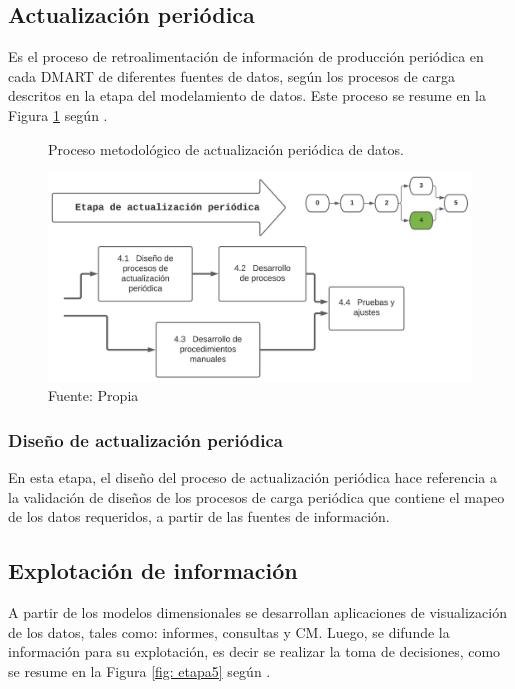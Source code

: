 \documentclass[12pt,jou]{apa7}
\begin{document}
\subsection{Actualización periódica}
Es el proceso de retroalimentación de información de producción periódica en cada DMART de diferentes fuentes de datos, según los procesos de carga descritos en la etapa del modelamiento de datos. Este proceso se resume en la Figura \ref{fig: etapa4} según \cite{LaPlata}.

\begin{figure}[h]
\caption{Proceso metodológico de actualización periódica de datos.}
\centering
\includegraphics[width=1\linewidth]{Figuras/etapa4}
\caption*{ Fuente: Propia}
\label{fig: etapa4}
\end{figure}

\subsubsection{Diseño de actualización periódica}
En esta etapa, el diseño del proceso de actualización periódica hace referencia a la validación de diseños de los procesos de carga periódica que contiene el mapeo de los datos requeridos, a partir de las fuentes de información.

\subsection{Explotación de información} 
A partir de los modelos dimensionales se desarrollan  aplicaciones de visualización de los datos, tales como: informes, consultas y CM. Luego, se difunde la información para su explotación, es decir se realizar la toma de decisiones, como se resume en la Figura \ref{fig: etapa5} según \cite{LaPlata}.
\end{document}
